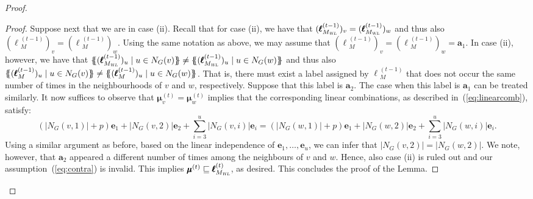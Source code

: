 \begin{proof}
\begin{proof}
Suppose next that we are in case (ii). Recall that for case (ii), we have that
$(\pmb{\ell}{}_{M_{\textsl{WL}}}^{(t-1)})_v=(\pmb{\ell}{}_{M_{\textsl{WL}}}^{(t-1)})_w$ and thus also  $(\pmb{\ell}{}_M^{(t-1)})_v=(\pmb{\ell}{}_M^{(t-1)})_w$.
	Using the same notation as above, we may assume that $(\pmb{\ell}{}_M^{(t-1)})_v=(\pmb{\ell}{}_M^{(t-1)})_w=\mathbf{a}_1$. In case (ii), however, we have that
	$
	\ldbl (\pmb{\ell}{}_{M_{\textsl{WL}}}^{(t-1)})_{u} \st u \in N_G(v) \rdbl\neq
	\ldbl (\pmb{\ell}{}_{M_{\textsl{WL}}}^{(t-1)})_{u} \st u \in N_G(w) \rdbl
	$ and thus also 
	$
	\ldbl (\pmb{\ell}{}_{M}^{(t-1)})_{u} \st u \in N_G(v) \rdbl\neq
	\ldbl (\pmb{\ell}{}_{M}^{(t-1)})_{u} \st u \in N_G(w) \rdbl
	$.
	That is, there must exist a label assigned by $\pmb{\ell}{}_M^{(t-1)}$ that does not occur the same number of times in the neighbourhoods of $v$ and $w$, respectively. Suppose that this label is $\mathbf{a}_2$. The case when this label is $\mathbf{a}_1$ can be treated similarly. 
	It now suffices to  observe that $\pmb{\mu}^{(t)}_{v}=\pmb{\mu}^{(t)}_{w}$ implies that
the corresponding linear combinations, as described in~(\ref{eq:linearcomb}), satisfy:
$$
\left(|N_G(v,1)|+p\right)\mathbf{e}_1 +|N_G(v,2)|\mathbf{e}_2+\sum_{i=3}^u |N_G(v,i)|\mathbf{e}_i=
\left(|N_G(w,1)|+p\right)\mathbf{e}_1 +|N_G(w,2)|\mathbf{e}_2+\sum_{i=3}^u |N_G(w,i)|\mathbf{e}_i.
$$
Using a similar argument as before, based on the linear independence of $\mathbf{e}_1,\ldots,\mathbf{e}_u$,
we can infer that $|N_G(v,2)|=|N_G(w,2)|$. We note,
however, that $\mathbf{a}_2$ appeared a different number
of times among the neighbours of $v$ and $w$. Hence, also case (ii) is ruled out and our assumption~(\ref{eq:contra})
is invalid. This implies $\pmb{\mu}^{(t)}\sqsubseteq\pmb{\ell}_{M_{\textsl{WL}}}^{(t)}$, as desired. This concludes the proof of the Lemma. 
\end{proof}




\end{proof}
